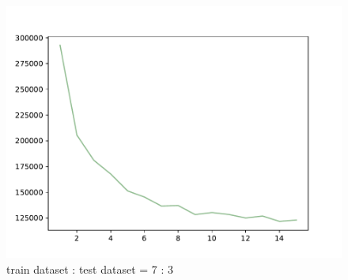 \documentclass{article}
\begin{document}
\begin{figure}[!h]
{\begin{minipage}{0.21\linewidth}
  \includegraphics[scale=0.23]{imgs/test_loss_3.pdf}
  \end{minipage}
}
\quad
{}
\caption{ train dataset : test dataset = 7 : 3}
\label{tv0.3}
\end{figure}
\end{document}
